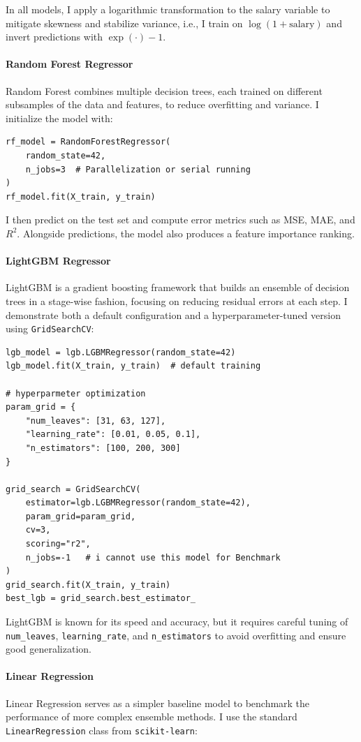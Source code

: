 \documentclass[12pt,a4paper]{article}
\begin{document}
\begin{multicols}{2}
In all models, I apply a logarithmic transformation to the salary variable to mitigate skewness and stabilize variance, i.e., I train on \(\log(1 + \text{salary})\) and invert predictions with \(\exp(\cdot) - 1\).

\paragraph{Random Forest Regressor} 
Random Forest combines multiple decision trees, each trained on different subsamples of the data and features, to reduce overfitting and variance. I initialize the model with:
\begin{lstlisting}
rf_model = RandomForestRegressor(
    random_state=42, 
    n_jobs=3  # Parallelization or serial running
)
rf_model.fit(X_train, y_train)
\end{lstlisting}
I then predict on the test set and compute error metrics such as MSE, MAE, and \(R^2\). Alongside predictions, the model also produces a feature importance ranking.

\paragraph{LightGBM Regressor}
LightGBM is a gradient boosting framework that builds an ensemble of decision trees in a stage-wise fashion, focusing on reducing residual errors at each step. I demonstrate both a default configuration and a hyperparameter-tuned version using \texttt{GridSearchCV}:

\begin{lstlisting}
lgb_model = lgb.LGBMRegressor(random_state=42)
lgb_model.fit(X_train, y_train)  # default training

# hyperparmeter optimization
param_grid = {
    "num_leaves": [31, 63, 127],
    "learning_rate": [0.01, 0.05, 0.1],
    "n_estimators": [100, 200, 300]
}

grid_search = GridSearchCV(
    estimator=lgb.LGBMRegressor(random_state=42),
    param_grid=param_grid,
    cv=3,
    scoring="r2",
    n_jobs=-1   # i cannot use this model for Benchmark
)
grid_search.fit(X_train, y_train)
best_lgb = grid_search.best_estimator_
\end{lstlisting}
LightGBM is known for its speed and accuracy, but it requires careful tuning of \texttt{num\_leaves}, \texttt{learning\_rate}, and \texttt{n\_estimators} to avoid overfitting and ensure good generalization.

\paragraph{Linear Regression}
Linear Regression serves as a simpler baseline model to benchmark the performance of more complex ensemble methods. I use the standard \texttt{LinearRegression} class from \texttt{scikit-learn}:


\end{multicols}
\end{document}

